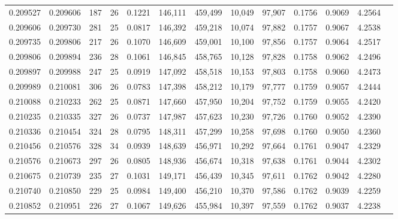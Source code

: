 \begin{tabular}{rrrrrrrrrrrrr}
0.209527 & 0.209606 &   187 &  26 &                                     0.1221 & 146,111 & 459,499 &  10,049 &  97,907 & 0.1756 & 0.9069 & 4.2564 \\
0.209606 & 0.209730 &   281 &  25 &                                     0.0817 & 146,392 & 459,218 &  10,074 &  97,882 & 0.1757 & 0.9067 & 4.2538 \\
0.209735 & 0.209806 &   217 &  26 &                                     0.1070 & 146,609 & 459,001 &  10,100 &  97,856 & 0.1757 & 0.9064 & 4.2517 \\
0.209806 & 0.209894 &   236 &  28 &                                     0.1061 & 146,845 & 458,765 &  10,128 &  97,828 & 0.1758 & 0.9062 & 4.2496 \\
0.209897 & 0.209988 &   247 &  25 &                                     0.0919 & 147,092 & 458,518 &  10,153 &  97,803 & 0.1758 & 0.9060 & 4.2473 \\
0.209989 & 0.210081 &   306 &  26 &                                     0.0783 & 147,398 & 458,212 &  10,179 &  97,777 & 0.1759 & 0.9057 & 4.2444 \\
0.210088 & 0.210233 &   262 &  25 &                                     0.0871 & 147,660 & 457,950 &  10,204 &  97,752 & 0.1759 & 0.9055 & 4.2420 \\
0.210235 & 0.210335 &   327 &  26 &                                     0.0737 & 147,987 & 457,623 &  10,230 &  97,726 & 0.1760 & 0.9052 & 4.2390 \\
0.210336 & 0.210454 &   324 &  28 &                                     0.0795 & 148,311 & 457,299 &  10,258 &  97,698 & 0.1760 & 0.9050 & 4.2360 \\
0.210456 & 0.210576 &   328 &  34 &                                     0.0939 & 148,639 & 456,971 &  10,292 &  97,664 & 0.1761 & 0.9047 & 4.2329 \\
0.210576 & 0.210673 &   297 &  26 &                                     0.0805 & 148,936 & 456,674 &  10,318 &  97,638 & 0.1761 & 0.9044 & 4.2302 \\
0.210675 & 0.210739 &   235 &  27 &                                     0.1031 & 149,171 & 456,439 &  10,345 &  97,611 & 0.1762 & 0.9042 & 4.2280 \\
0.210740 & 0.210850 &   229 &  25 &                                     0.0984 & 149,400 & 456,210 &  10,370 &  97,586 & 0.1762 & 0.9039 & 4.2259 \\
0.210852 & 0.210951 &   226 &  27 &                                     0.1067 & 149,626 & 455,984 &  10,397 &  97,559 & 0.1762 & 0.9037 & 4.2238 \\

\end{tabular}
